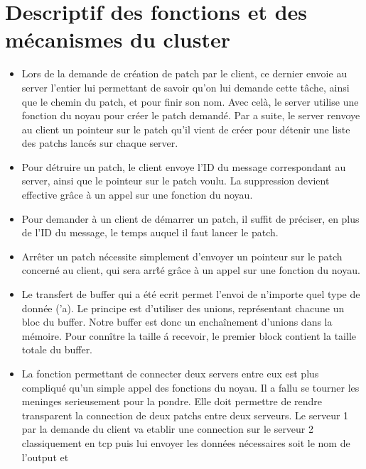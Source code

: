 \section{Descriptif des fonctions et des m\'ecanismes du cluster}

\begin{itemize}

\item Lors de la demande de cr\'eation de patch par le client, ce dernier 
envoie au server l'entier lui permettant de savoir qu'on lui demande cette 
t\^ache, ainsi que le chemin du patch, et pour finir son nom. Avec cel\`a, le 
server utilise une fonction du noyau pour cr\'eer le patch demand\'e. Par
a suite, le server renvoye au client un pointeur sur le patch qu'il vient de 
cr\'eer pour d\'etenir une liste des patchs lanc\'es sur chaque server.
\newline
\item Pour d\'etruire un patch, le client envoye l'ID du message correspondant 
au server, ainsi que le pointeur sur le patch voulu. La suppression devient 
effective gr\^ace \`a un appel sur une fonction du noyau.
\newline
\item Pour demander \`a un client de d\'emarrer un patch, il suffit de 
pr\'eciser, en plus de l'ID du message, le temps auquel il faut lancer le 
patch.
\newline
\item Arr\^eter un patch n\'ecessite simplement d'envoyer un pointeur sur le 
patch concern\'e au client, qui sera arr\^t\'e gr\^ace \`a un appel sur une 
fonction du noyau.
\newline
\item Le transfert de buffer qui a \'et\'e ecrit permet l'envoi de n'importe
quel type de donn\'ee ('a). Le principe est d'utiliser des unions, 
repr\'esentant chacune un bloc du buffer. Notre buffer est donc un 
encha\^inement d'unions dans la m\'emoire. Pour conn\^itre la taille \'a 
recevoir, le premier block contient la taille totale du buffer. 
\newline
\item La fonction permettant de connecter deux servers entre eux est plus 
compliqu\'e qu'un simple appel des fonctions du noyau. Il a fallu se tourner 
les meninges serieusement pour la pondre. Elle doit permettre de rendre 
transparent la connection de deux patchs entre deux serveurs. Le serveur 1 par 
la demande du client va etablir une connection sur le serveur 2 classiquement 
en tcp puis lui envoyer les donn\'ees n\'ecessaires soit le nom de l'output et 

\end{itemize}
